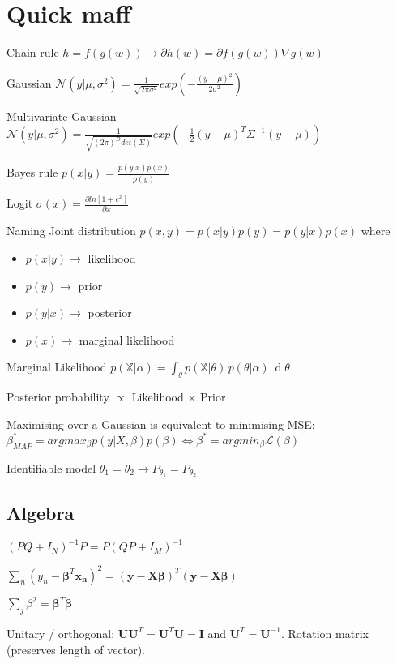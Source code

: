 \section{Quick maff}
Chain rule $h = f(g(w)) \rightarrow \partial h(w) = \partial f(g(w)) \nabla g(w)$

Gaussian $\mathcal{N}(y|\mu, \sigma^2) = \frac{1}{\sqrt{2\pi \sigma^2}} exp(-\frac{(y-\mu)^2}{2\sigma^2})$

Multivariate Gaussian $\mathcal{N}(y|\mu, \sigma^2) = \frac{1}{\sqrt{(2\pi)^D det(\Sigma)}} exp(-\frac{1}{2} (y-\mu)^T \Sigma^{-1} (y-\mu))$

Bayes rule $p(x|y) = \frac{p(y|x) p(x)}{p(y)}$

Logit $\sigma(x) = \frac{\partial ln[1+e^x]}{\partial x}$

Naming
Joint distribution $p(x,y) = p(x|y)p(y)=p(y|x)p(x)$ where
\begin{itemize}
\item $p(x|y) \rightarrow$ likelihood 
\item $p(y) \rightarrow$ prior
\item $p(y|x) \rightarrow$ posterior
\item $p(x) \rightarrow$ marginal likelihood
\end{itemize}

Marginal Likelihood \newline $p({\mathbb  {X}}|\alpha )=\int _{\theta }p({\mathbb  {X}}|\theta )\,p(\theta |\alpha )\ \operatorname {d}\!\theta $

Posterior probability $\propto$ Likelihood $\times$ Prior

Maximising over a Gaussian is equivalent to minimising MSE: $\beta_{MAP}^* = arg max_{\beta} p(y|X,\beta)p(\beta) \Leftrightarrow \beta^* = arg min_{\beta} \mathcal{L}(\beta)$

Identifiable model $\theta_1 = \theta_2 \rightarrow P_{\theta_1} = P_{\theta_2}$

\subsection{Algebra}
$(PQ + I_N)^{-1} P = P (QP + I_M)^{-1}$

$\sum_n (y_{n} -\mathbf{\beta}^T\mathbf{x_n})^2 = (\mathbf{y} - \mathbf{X}\mathbf{\beta})^T(\mathbf{y} - \mathbf{X}\mathbf{\beta})$

$\sum_j \beta^2 = \mathbf{\beta}^T \mathbf{\beta}$

Unitary / orthogonal: $\mathbf{U}\mathbf{U}^T=\mathbf{U}^T\mathbf{U} = \mathbf{I}$ and $\mathbf{U}^T = \mathbf{U}^{-1}$. Rotation matrix (preserves length of vector).